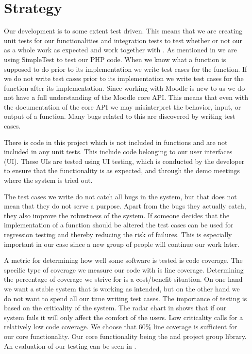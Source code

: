 \section{Strategy}
\label{sec:strategy}
\newcommand{\idealCC}{$60\%$}
Our development is to some extent test driven.
This means that we are creating unit tests for our functionalities and integration tests to test whether or not our \subsystem{} as a whole work as expected and work together with \moodle{}.
As mentioned in  we are using SimpleTest to test our PHP code.
When we know what a function is supposed to do prior to its implementation we write test cases for the function.
If we do not write test cases prior to its implementation we write test cases for the function after its implementation. 
Since working with Moodle is new to us we do not have a full understanding of the Moodle core API.
This means that even with the documentation of the \moodle{} core API we may misinterpret the behavior, input, or output of a function.
Many bugs related to this are discovered by writing test cases.

There is code in this project which is not included in functions and are not included in any unit tests.
This include code belonging to our user interfaces (UI).
These UIs are tested using UI testing, which is conducted by the developer to ensure that the functionality is as expected, and through the demo meetings where the system is tried out. 

The test cases we write do not catch all bugs in the system, but that does not mean that they do not serve a purpose.
Apart from the bugs they actually catch, they also improve the robustness of the system.
If someone decides that the implementation of a function should be altered the test cases can be used for regression testing and thereby reducing the risk of failures. 
This is especially important in our case since a new group of people will continue our work later.

A metric for determining how well some software is tested is code coverage. 
The specific type of coverage we measure our code with is line coverage. 
Determining the percentage of coverage we strive for is a cost/benefit situation.
On one hand we want a stable system that is working as intended, but on the other hand we do not want to spend all our time writing test cases.
The importance of testing is based on the criticality of the system.
The radar chart in  shows that if our system fails it will only affect the comfort of the users.
Low criticality calls for a relatively low code coverage.
We choose that \idealCC{} line coverage is sufficient for our core functionality.
Our core functionality being the \admlib{} and project group library.
An evaluation of our testing can be seen in .

